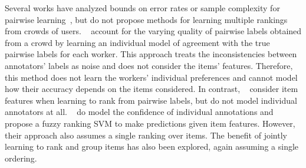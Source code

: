 Several works have analyzed bounds on error rates or sample complexity for pairwise 
learning~\citep{chen2015spectral,shah2015estimation}, but do not propose methods
for learning multiple rankings from crowds of users.
~\citet{chen2013pairwise} account for the varying quality of pairwise labels obtained from a crowd
by learning an individual model of agreement with the true pairwise labels for each worker.  
This approach treats the inconsistencies between annotators' labels as noise and does not consider the
items' features. Therefore, this method does not learn the workers' individual preferences
and cannot model how their accuracy depends on the items considered. 
In contrast, ~\citet{fu2016robust} consider item features when learning to rank from pairwise labels, 
but do not model individual annotators at all.
~\citet{uchida2017entity} do model the confidence of individual annotations
and propose a fuzzy ranking SVM to make predictions given item features. 
However, their approach also assumes a single ranking over items.
The benefit of jointly learning to rank and group items has also been explored\citep{li2018simultaneous}, again assuming a single ordering.

